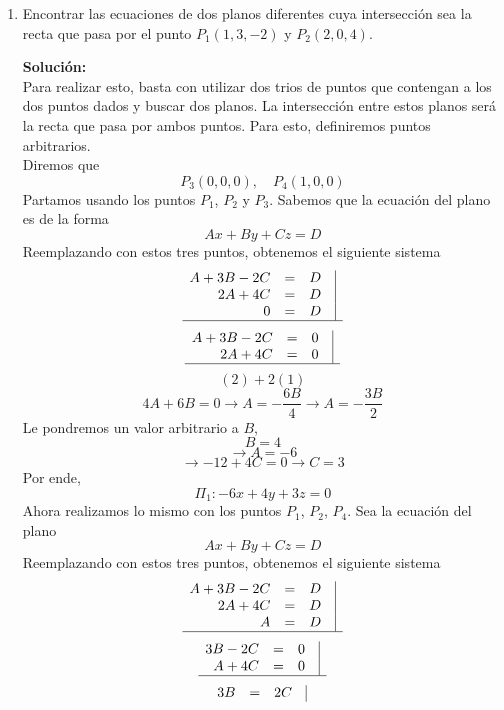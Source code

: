 \documentclass[12pt]{article}
\newenvironment{solucion}
{\begin{mdframed}[backgroundcolor=black!10]
		{\bf Solución:}\\
	}
	{
	\end{mdframed}
}
\newenvironment{preguntas}
{\begin{enumerate}\itemsep12pt
	}
	{
	\end{enumerate}
}
\newcommand{\ra}{\rightarrow}
\begin{document}
\begin{preguntas}
\begin{solucion}
		$$<x,y,z> = (0, 2, -3) + \lambda (1,-2,0)$$
\end{solucion}
\item Encontrar las ecuaciones de dos planos diferentes cuya intersección sea la recta que pasa por el punto $P_1(1,3,-2)$ y $P_2(2,0,4)$.
\begin{solucion}
Para realizar esto, basta con utilizar dos trios de puntos que contengan a los dos puntos dados y buscar dos planos. La intersección entre estos planos será la recta que pasa por ambos puntos. Para esto, definiremos puntos arbitrarios.\\
		Diremos que
		$$P_3(0, 0, 0), \quad P_4(1,0,0)$$
		Partamos usando los puntos $P_1$, $P_2$ y $P_3$. Sabemos que la ecuación del plano es de la forma
		$$Ax + By + Cz = D$$
		Reemplazando con estos tres puntos, obtenemos el siguiente sistema
		$$
		\begin{array}{rcrr}
		A + 3B - 2C & = & D& \vline\\
		2A + 4C & = & D & \vline\\
		0 & = & D &\vline\\
		\hline
		\end{array}
		$$
		$$
		\begin{array}{rcrr}
		A + 3B - 2C & = & 0& \vline\\
		2A + 4C & = & 0 & \vline\\
		\hline
		\end{array}
		$$
		$$(2) + 2(1)$$
		$$4A + 6B = 0 \ra A = -\dfrac{6B}{4} \ra A = -\dfrac{3B}{2}$$
		Le pondremos un valor arbitrario a $B$,
		$$B = 4$$
		$$\ra A = -6$$
		$$\ra -12 + 4C = 0 \ra C = 3$$
		Por ende,
		$$\Pi_1: -6x + 4y + 3z = 0$$
		Ahora realizamos lo mismo con los puntos $P_1$, $P_2$, $P_4$. Sea la ecuación del plano
		$$Ax + By + Cz = D$$
		Reemplazando con estos tres puntos, obtenemos el siguiente sistema
		$$
		\begin{array}{rcrr}
		A + 3B - 2C & = & D& \vline\\
		2A + 4C & = & D & \vline\\
		A & = & D &\vline\\
		\hline
		\end{array}
		$$
		$$
		\begin{array}{rcrr}
		3B - 2C & = & 0& \vline\\
		A + 4C & = & 0 & \vline\\
		\hline
		\end{array}
		$$
		$$
		\begin{array}{rcrr}
		3B & = & 2C& \vline\\

\end{array}$$
\end{solucion}
\end{preguntas}
\end{document}
